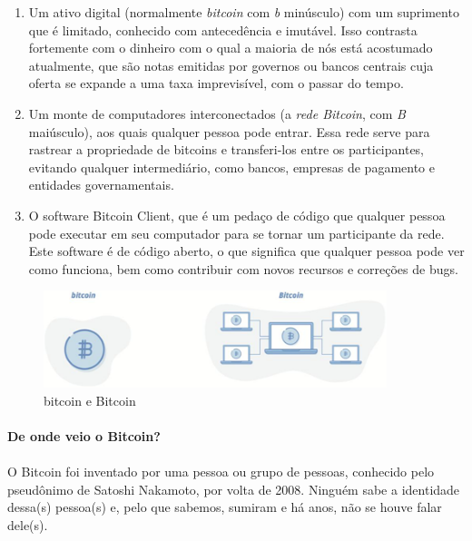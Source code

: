 \begin{samepage}
\begin{enumerate}
\item Um ativo digital (normalmente \textit{bitcoin} com \textit{b} minúsculo) com um suprimento que é limitado, conhecido com antecedência e imutável. Isso contrasta fortemente com o dinheiro com o qual a maioria de nós está acostumado atualmente, que são notas emitidas por governos ou bancos centrais cuja oferta se expande a uma taxa imprevisível, com o passar do tempo.
\item Um monte de computadores interconectados (a \textit{rede Bitcoin}, com \textit{B} maiúsculo), aos quais qualquer pessoa pode entrar. Essa rede serve para rastrear a propriedade de bitcoins e transferi-los entre os participantes, evitando qualquer intermediário, como bancos, empresas de pagamento e entidades governamentais.
\item O software Bitcoin Client, que é um pedaço de código que qualquer pessoa pode executar em seu computador para se tornar um participante da rede. Este software é de código aberto, o que significa que qualquer pessoa pode ver como funciona, bem como contribuir com novos recursos e correções de bugs.
\end{enumerate}
\end{samepage}

\newpage

\begin{figure}
  \centering
  \includegraphics[width=10cm]{imagens/bitcoin-capitulo-1.png}
  \caption{bitcoin e Bitcoin}
\end{figure}
  
\newpage
\paragraph{De onde veio o Bitcoin?}
\paragraph{}

O Bitcoin foi inventado por uma pessoa ou grupo de pessoas, conhecido pelo pseudônimo de Satoshi Nakamoto, por volta de 2008. Ninguém sabe a identidade dessa(s) pessoa(s) e, pelo que sabemos, sumiram e há anos, não se houve falar dele(s).

